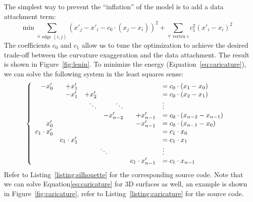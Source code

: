 \documentclass[notitlepage,oneside]{book}
\begin{document}
The simplest way to prevent the ``inflation'' of the model is to add a data attachment term:
\begin{equation}
\label{eq:caricature}
\min \sum\limits_{\forall \text{~edge~} (i,j)} \left(x'_j - x'_i -  c_0\cdot\left(x_j - x_i\right)  \right)^2 + \sum\limits_{\forall \text{~vertex~} i} c_1^2 \left( x'_i - x_i \right)^2
\end{equation}
The coefficients $c_0$ and $c_1$ allow us to tune the optimization to achieve the desired trade-off between the curvature exaggeration and the data attachment.
The result is shown in Figure~\ref{fig:lenin}.
To minimize the energy (Equation~\eqref{eq:caricature}), we can solve the following system in the least squares sense:
\begin{equation}
\label{eq:carsyst}
\left \{ \begin{array}{rrrrrl}
-{x'_0}         & + {x'_1}        &                       &                           &                           & =  c_0\cdot \left( x_1 - x_0\right)  \\
                        & - {x'_1}        & +{x'_2}       &                           &                           & =  c_0 \cdot \left(x_2 - x_1\right)  \\
                        &                         &    \ddots             & \ddots                    &                           &    \vdots         \\
                        &                         &                       &   -{x'_{n-2}}     & +{x'_{n-1}}       & =  c_0 \cdot \left(x_{n-2} - x_{n-1}\right)  \\
 {x'_0}         &                         &                       &                           & -{x'_{n-1}}       & =  c_0 \cdot \left(x_{n-1} - x_0\right)  \\
c_1\cdot {x'_0} &                         &                       &                           &                           & =  c_1\cdot x_0  \\
                        & c_1\cdot {x'_1} &                       &                           &                           & =  c_1\cdot x_1  \\
                        &                         &  \multicolumn{2}{c}{                      \ddots}                    &                           & \vdots   \\
                        &                         &                       &                           &    c_1\cdot {x'_{n-1}}           & =  c_1\cdot x_{n-1}  \\
\end{array} \right.
\end{equation}
Refer to Listing~\ref{listing:silhouette} for the corresponding source code. Note that we can solve Equation\eqref{eq:caricature} for 3D surfaces as well, an example is shown in Figure~\ref{fig:caricature},
refer to Listing~\ref{listing:caricature} for the source code.
\end{document}
